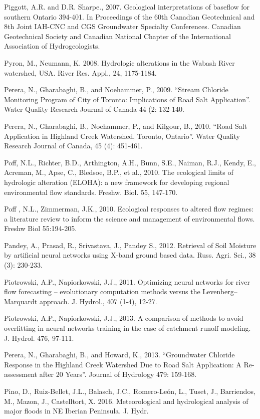 \begin{hangingpar}{2em}
Piggott, A.R. and D.R. Sharpe., 2007. Geological interpretations of baseflow for southern Ontario 394-401. In Proceedings of the 60th Canadian Geotechnical and 8th Joint IAH-CNC and CGS Groundwater Specialty Conferences. Canadian Geotechnical Society and Canadian National Chapter of the International Association of Hydrogeologists. 

Pyron, M., Neumann, K. 2008. Hydrologic alterations in the Wabash River watershed, USA. River Res. Appl., 24, 1175-1184.

Perera, N., Gharabaghi, B., and Noehammer, P., 2009.  ``Stream Chloride Monitoring Program of City of Toronto: Implications of Road Salt Application''.   Water Quality Research Journal of Canada 44 (2: 132-140.

Perera, N., Gharabaghi, B., Noehammer, P., and Kilgour, B., 2010.  ``Road Salt Application in Highland Creek Watershed, Toronto, Ontario''.   Water Quality Research Journal of Canada, 45 (4): 451-461.

Poff, N.L., Richter, B.D., Arthington, A.H., Bunn, S.E., Naiman, R.J., Kendy, E., Acreman, M., Apse, C., Bledsoe, B.P., et al., 2010. The ecological limits of hydrologic alteration (ELOHA): a new framework for developing regional environmental flow standards. Freshw. Biol. 55, 147-170.

Poff , N.L., Zimmerman, J.K., 2010. Ecological responses to altered flow regimes: a literature review to inform the science and management of environmental flows. Freshw Biol 55:194-205.

Pandey, A., Prasad, R., Srivastava, J., Pandey S., 2012.  Retrieval of Soil Moisture by artificial neural networks using X-band ground based data. Russ. Agri. Sci., 38 (3): 230-233.

Piotrowski, A.P., Napiorkowski, J.J., 2011. Optimizing neural networks for river flow forecasting – evolutionary computation methods versus the Levenberg– Marquardt approach. J. Hydrol., 407 (1-4), 12-27.

Piotrowski, A.P., Napiorkowski, J.J., 2013. A comparison of methods to avoid overfitting in neural networks training in the case of catchment runoff modeling. J. Hydrol. 476, 97-111.

Perera, N., Gharabaghi, B., and Howard, K., 2013.  ``Groundwater Chloride Response in the Highland Creek Watershed Due to Road Salt Application: A Re-assessment after 20 Years''.   Journal of Hydrology 479: 159-168.

Pino, D., Ruiz-Bellet, J.L., Balasch, J.C., Romero-León, L., Tuset, J., Barriendos, M., Mazon, J., Castelltort, X.	2016. Meteorological and hydrological analysis of major floods in NE Iberian Peninsula.  J. Hydr.


\end{hangingpar}
